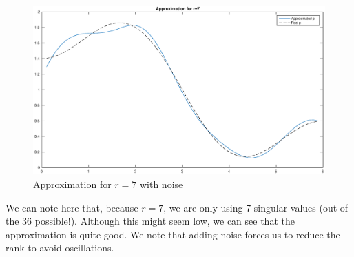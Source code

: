 \begin{figure}
\begin{center}
\includegraphics[scale=0.5]{rank7.eps}
\caption{Approximation for $r=7$ with noise}
\label{rank7}
\end{center}
\end{figure} 

We can note here that, because $r=7$, we are only using 7 singular values (out of the 36 possible!). Although this might seem low, we can see that the approximation is quite good. We note that adding noise forces us to reduce the rank to avoid oscillations.